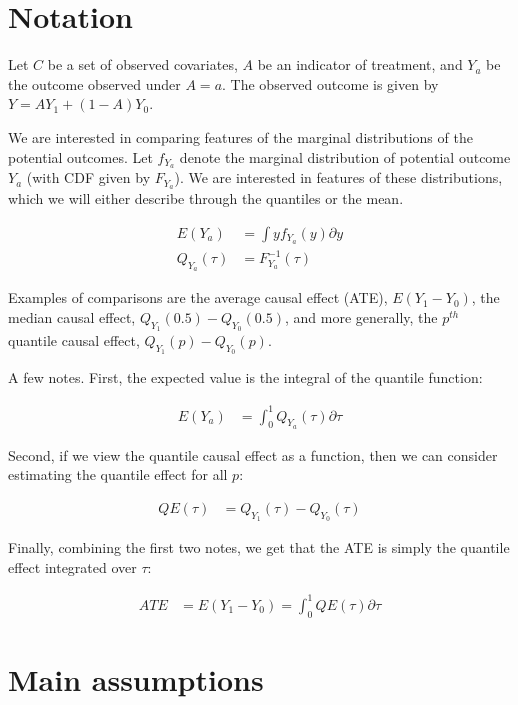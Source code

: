 \documentclass{article}\usepackage[]{graphicx}\usepackage[]{color}
\begin{document}
\section{Notation}

Let $C$ be a set of observed covariates, $A$ be an indicator of treatment, and $Y_a$ be the outcome observed under $A=a$. The observed outcome is given by $Y = AY_1 + (1-A)Y_0$. 

We are interested in comparing features of the marginal distributions of the potential outcomes. Let $f_{Y_a}$ denote the marginal distribution of potential outcome $Y_a$ (with CDF given by $F_{Y_a}$). We are interested in features of these distributions, which we will either describe through the quantiles or the mean. 

\begin{align*}
  E(Y_a) &= \int y f_{Y_a}(y) \partial y \\
  Q_{Y_a}(\tau) &= F^{-1}_{Y_a}(\tau)
\end{align*}

Examples of comparisons are the average causal effect (ATE), $E(Y_1-Y_0)$, the median causal effect, $Q_{Y_1}(0.5)-Q_{Y_0}(0.5)$, and more generally, the $p^{th}$ quantile causal effect, $Q_{Y_1}(p)-Q_{Y_0}(p)$.

A few notes. First, the expected value is the integral of the quantile function:

\begin{align*}
  E(Y_a) &= \int_0^1 Q_{Y_a}(\tau) \partial \tau
\end{align*}

\noindent Second, if we view the quantile causal effect as a function, then we can consider estimating the quantile effect for all $p$:

\begin{align*}
  QE(\tau) &= Q_{Y_1}(\tau)-Q_{Y_0}(\tau)
\end{align*}

\noindent Finally, combining the first two notes, we get that the ATE is simply the quantile effect integrated over $\tau$:

\begin{align*}
  ATE &= E(Y_1-Y_0) = \int_0^1 QE(\tau) \partial \tau
\end{align*}

\section{Main assumptions}
\end{document}
